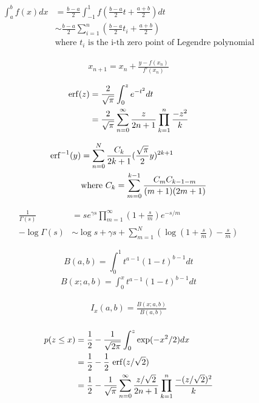 \begin{align*} 
    \int_a^bf(x)dx &= \frac{b-a}{2}\int_{-1}^1f\left(\frac{b-a}{2}t+\frac{a+b}{2}\right)dt\\
    &\sim \frac{b-a}{2}\sum_{i=1}^{n}\left(\frac{b-a}{2}t_i+\frac{a+b}{2}\right)\\
    &\text{where $t_i$ is the i-th zero point of Legendre polynomial}
\end{align*}

\begin{align*} 
    x_{n+1} = x_n + \frac{y-f(x_n)}{f'(x_n)}
\end{align*}

\begin{align*} 
    {\rm erf}(z) &= \frac{2}{\sqrt{\pi}}\int_{0}^{z}e^{-t^2}dt \\
    &= \frac{2}{\sqrt{\pi}}\sum_{n=0}^{\infty}\frac{z}{2n+1}\prod_{k=1}^{n}\frac{-z^2}{k}
\end{align*}

\begin{align*} 
    {\rm erf}^{-1}(y) &= \sum_{n=0}^{N}\frac{C_k}{2k+1}(\frac{\sqrt{\pi}}{2}y)^{2k+1} \\
    &\text{where}~C_k = \sum_{m=0}^{k-1}\frac{C_mC_{k-1-m}}{(m+1)(2m+1)}
\end{align*}

\begin{align*} 
    \frac{1}{\Gamma(s)} &= se^{\gamma s}\prod_{m=1}^{\infty}(1+\frac{s}{m})e^{-s/m} \\
    -\log\Gamma(s) &\sim \log s+\gamma s + \sum_{m=1}^{N}\left(\log(1+\frac{s}{m})-\frac{s}{m}\right)
\end{align*}

\[ B(a,b) = \int_0^1 t^{a-1}(1-t)^{b-1}dt \]
\begin{align*}
    B(x;a,b) = \int_0^x t^{a-1}(1-t)^{b-1}dt
\end{align*}

\begin{align*}
    I_x(a,b) = \frac{B(x;a,b)}{B(a,b)} \\
\end{align*}


\begin{align*} 
    p(z \leq x) &= \frac{1}{2} - \frac{1}{\sqrt{2\pi}}\int_{0}^{z}\exp(-x^2/2)dx \\
    &= \frac{1}{2}-\frac{1}{2}~{\rm erf}(z/\sqrt{2}) \\
    &= \frac{1}{2}-\frac{1}{\sqrt{\pi}}\sum_{n=0}^{\infty}\frac{z/\sqrt{2}}{2n+1}\prod_{k=1}^{n}\frac{-(z/\sqrt{2})^2}{k}
\end{align*}

